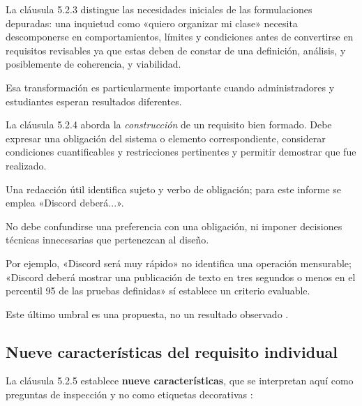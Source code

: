 \documentclass[12pt,a4paper]{article}
\begin{document}
La cláusula 5.2.3 distingue las necesidades iniciales de las formulaciones depuradas: una inquietud como «quiero organizar mi clase» necesita descomponerse en comportamientos, límites y condiciones antes de convertirse en requisitos revisables ya que estas deben de constar de una definición, análisis, y posiblemente de coherencia, y viabilidad.

Esa transformación es particularmente importante cuando administradores y estudiantes esperan resultados diferentes. 

La cláusula 5.2.4 aborda la \emph{construcción} de un requisito bien formado. Debe expresar una obligación del sistema o elemento correspondiente, considerar condiciones cuantificables y restricciones pertinentes y permitir demostrar que fue realizado.

Una redacción útil identifica sujeto y verbo de obligación; para este informe se emplea «Discord deberá...».

No debe confundirse una preferencia con una obligación, ni imponer decisiones técnicas innecesarias que pertenezcan al diseño.

Por ejemplo, «Discord será muy rápido» no identifica una operación mensurable; «Discord deberá mostrar una publicación de texto en tres segundos o menos en el percentil 95 de las pruebas definidas» sí establece un criterio evaluable.

Este último umbral es una propuesta, no un resultado observado \cite[cláusula~5.2.4]{iso29148}.

\subsection{Nueve características del requisito individual}

La cláusula 5.2.5 establece \textbf{nueve características}, que se interpretan aquí como preguntas de inspección y no como etiquetas decorativas \cite{iso29148}:
\end{document}
